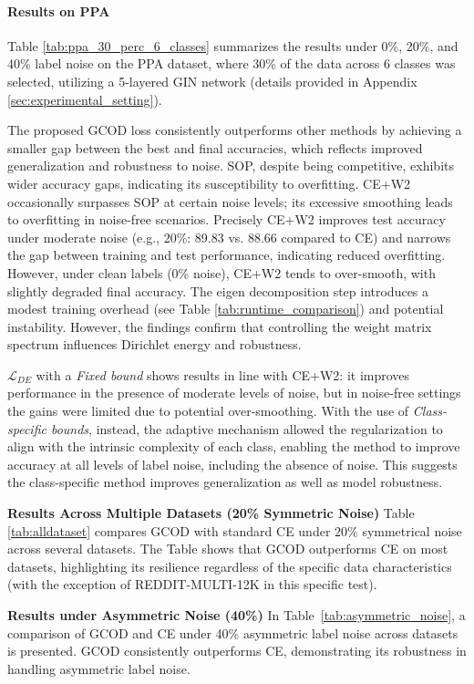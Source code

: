 \paragraph{Results on PPA}
Table \ref{tab:ppa_30_perc_6_classes} summarizes the results under 0\%, 20\%, and 40\% label noise on the PPA dataset, where 30\% of the data across $6$ classes was selected, utilizing a 5-layered GIN network (details provided in Appendix \ref{sec:experimental_setting}).

The proposed {GCOD} loss consistently outperforms other methods by achieving a smaller gap between the best and final accuracies, which reflects improved generalization and robustness to noise. 
SOP, despite being competitive, exhibits wider accuracy gaps, indicating its susceptibility to overfitting. 
{CE+W2} occasionally surpasses SOP at certain noise levels; its excessive smoothing leads to overfitting in noise-free scenarios. 
Precisely {CE+W2} improves test accuracy under moderate noise (e.g., 20\%: 89.83 vs. 88.66 compared to CE) and narrows the gap between training and test performance, indicating reduced overfitting. 
However, under clean labels (0\% noise), CE+W2 tends to over-smooth, with slightly degraded final accuracy. The eigen decomposition step introduces a modest training overhead (see Table \ref{tab:runtime_comparison}) and potential instability. However, the findings confirm that controlling the weight matrix spectrum influences Dirichlet energy and robustness. 

$\mathcal L_{DE}$ with a \emph{Fixed bound} shows results in line with CE+W2: it improves performance in the presence of moderate levels of noise, but in noise-free settings the gains were limited due to potential over-smoothing. With the use of \emph{Class-specific bounds}, instead, the adaptive mechanism allowed the regularization to align with the intrinsic complexity of each class, enabling the method to improve accuracy at all levels of label noise, including the absence of noise. This suggests the class-specific method improves generalization as well as model robustness.

\textbf{Results Across Multiple Datasets (20\% Symmetric Noise)}
Table \ref{tab:alldataset} compares {GCOD} with standard CE under 20\% symmetrical noise across several datasets.
The Table shows that {GCOD} outperforms CE on most datasets, highlighting its resilience regardless of the specific data characteristics (with the exception of REDDIT-MULTI-12K in this specific test).

\textbf{Results under Asymmetric Noise (40\%)}
In Table~\ref{tab:asymmetric_noise}, a comparison of {GCOD} and CE under 40\% asymmetric label noise across datasets is presented. {GCOD} consistently outperforms CE, demonstrating its robustness in handling asymmetric label noise.

